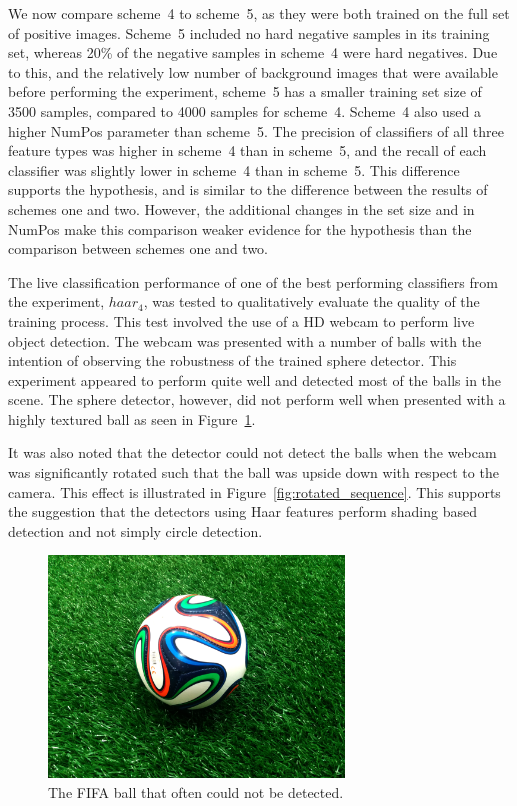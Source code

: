 \documentclass{sig-alternate-05-2015}
\begin{document}
{		We now compare scheme~4 to scheme~5, as they were both trained on the full set of positive images. Scheme~5 included no hard negative samples in its training set, whereas 20\% of the negative samples in scheme~4 were hard negatives. Due to this, and the relatively low number of background images that were available before performing the experiment, scheme~5 has a smaller training set size of 3500 samples, compared to 4000 samples for scheme~4. Scheme~4 also used a higher NumPos parameter than scheme~5.
		The precision of classifiers of all three feature types was higher in scheme~4 than in scheme~5, and the recall of each classifier was slightly lower in scheme~4 than in scheme~5.
		This difference supports the hypothesis, and is similar to the difference between the results of schemes one and two. However, the additional changes in the set size and in NumPos make this comparison weaker evidence for the hypothesis than the comparison between schemes one and two.

		The live classification performance of one of the best performing classifiers from the experiment, \(haar_4\), was tested to qualitatively evaluate the quality of the training process.
		This test involved the use of a HD webcam to perform live object detection. The webcam was presented with a number of balls with the intention of observing the robustness of the trained sphere detector.
		This experiment appeared to perform quite well and detected most of the balls in the scene. The sphere detector, however, did not perform well when presented with a highly textured ball as seen in Figure~\ref{fig:fifa_ball}.

		It was also noted that the detector could not detect the balls when the webcam was significantly rotated such that the ball was upside down with respect to the camera. This effect is illustrated in Figure~\ref{fig:rotated_sequence}. This supports the suggestion that the detectors using Haar features perform shading based detection and not simply circle detection.

		\begin{figure}
			\centering
			\includegraphics[width=0.7\textwidth]{images/fifa_ball}
			\caption{The FIFA ball that often could not be detected.}
			\label{fig:fifa_ball}
		\end{figure}
		\newpage

}
\end{document}
